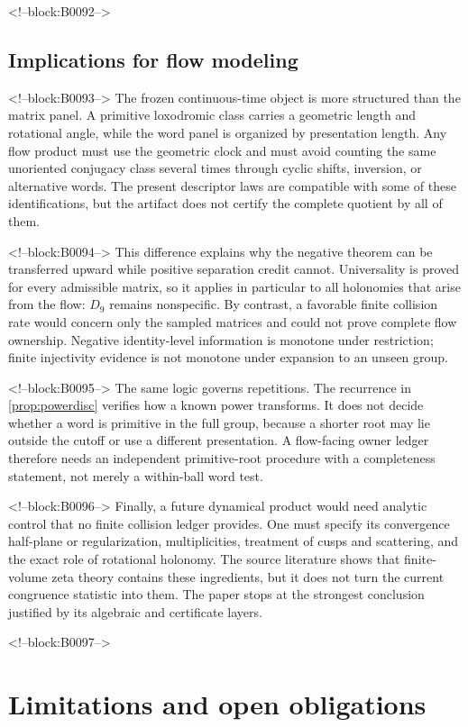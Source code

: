 \documentclass[11pt,a4paper]{article}
\theoremstyle{definition}
\theoremstyle{remark}
\begin{document}
<!--block:B0092-->
\subsection{Implications for flow modeling}

<!--block:B0093-->
The frozen continuous-time object is more structured than the matrix panel. A primitive loxodromic class carries a geometric length and rotational angle, while the word panel is organized by presentation length. Any flow product must use the geometric clock and must avoid counting the same unoriented conjugacy class several times through cyclic shifts, inversion, or alternative words. The present descriptor laws are compatible with some of these identifications, but the artifact does not certify the complete quotient by all of them.

<!--block:B0094-->
This difference explains why the negative theorem can be transferred upward while positive separation credit cannot. Universality is proved for every admissible matrix, so it applies in particular to all holonomies that arise from the flow: \(D_9\) remains nonspecific. By contrast, a favorable finite collision rate would concern only the sampled matrices and could not prove complete flow ownership. Negative identity-level information is monotone under restriction; finite injectivity evidence is not monotone under expansion to an unseen group.

<!--block:B0095-->
The same logic governs repetitions. The recurrence in \cref{prop:powerdisc} verifies how a known power transforms. It does not decide whether a word is primitive in the full group, because a shorter root may lie outside the cutoff or use a different presentation. A flow-facing owner ledger therefore needs an independent primitive-root procedure with a completeness statement, not merely a within-ball word test.

<!--block:B0096-->
Finally, a future dynamical product would need analytic control that no finite collision ledger provides. One must specify its convergence half-plane or regularization, multiplicities, treatment of cusps and scattering, and the exact role of rotational holonomy. The source literature shows that finite-volume zeta theory contains these ingredients, but it does not turn the current congruence statistic into them. The paper stops at the strongest conclusion justified by its algebraic and certificate layers.

<!--block:B0097-->
\section{Limitations and open obligations}
\end{document}
